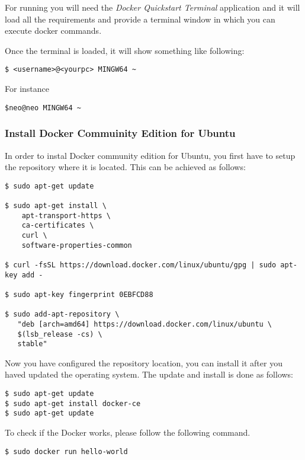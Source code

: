 For running you will need the \textit{Docker Quickstart Terminal} application
and it will load all the requirements and provide a terminal window in
which you can execute docker commands.

Once the terminal is loaded, it will show something like following:

\begin{verbatim}
$ <username>@<yourpc> MINGW64 ~
\end{verbatim}

For instance

\begin{verbatim}
$neo@neo MINGW64 ~
\end{verbatim}

\subsubsection{Install Docker Commuinity Edition for
Ubuntu}\label{install-docker-commuinity-edition-for-ubuntu}

In order to instal Docker community edition for Ubuntu, you first have
to setup the repository where it is located. This can be achieved as
follows:

\begin{verbatim}
$ sudo apt-get update

$ sudo apt-get install \
    apt-transport-https \
    ca-certificates \
    curl \
    software-properties-common

$ curl -fsSL https://download.docker.com/linux/ubuntu/gpg | sudo apt-key add -

$ sudo apt-key fingerprint 0EBFCD88

$ sudo add-apt-repository \
   "deb [arch=amd64] https://download.docker.com/linux/ubuntu \
   $(lsb_release -cs) \
   stable"
\end{verbatim}

Now you have configured the repository location, you can install it
after you haved updated the operating system. The update and install is
done as follows:

\begin{verbatim}
$ sudo apt-get update
$ sudo apt-get install docker-ce
$ sudo apt-get update
\end{verbatim}

To check if the Docker works, please follow the following command.

\begin{verbatim}
$ sudo docker run hello-world
\end{verbatim}

